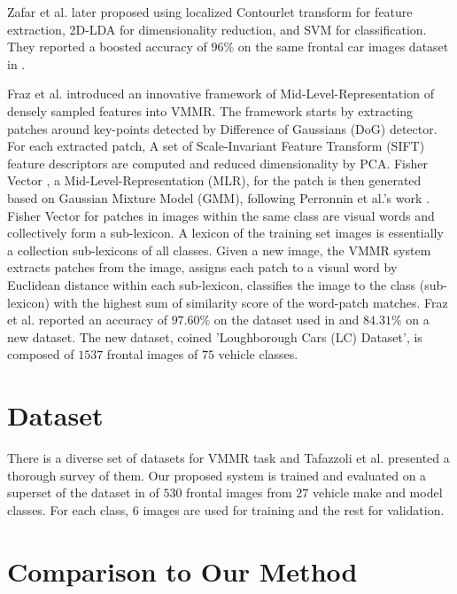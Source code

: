 Zafar et al. \citep{zafar2009localized} later proposed using localized Contourlet transform for feature extraction, 2D-LDA for dimensionality reduction, and SVM for classification.
They reported a boosted accuracy of $96\%$ on the same frontal car images dataset in \citep{zafar2007two}.


Fraz et al. \citep{fraz2014mid} introduced an innovative framework of Mid-Level-Representation of densely sampled features into VMMR.
The framework starts by extracting patches around key-points detected by Difference of Gaussians (DoG) detector.
For each extracted patch, A set of Scale-Invariant Feature Transform (SIFT) \citep{lowe2004distinctive} feature descriptors are computed and reduced dimensionality by PCA.
Fisher Vector \citep{jaakkola1999exploiting}, a Mid-Level-Representation (MLR), for the patch is then generated based on Gaussian Mixture Model (GMM), following Perronnin et al.'s work \citep{perronnin2010improving}.
Fisher Vector for patches in images within the same class are visual words and collectively form a sub-lexicon.
A lexicon of the training set images is essentially a collection sub-lexicons of all classes.
Given a new image, the VMMR system 
extracts patches from the image, 
assigns each patch to a visual word by Euclidean distance within each sub-lexicon, 
classifies the image to the class (sub-lexicon) with the highest sum of similarity score of the word-patch matches.
Fraz et al. reported an accuracy of $97.60\%$ on the dataset used in \citep{zafar2009localized} and $84.31\%$ on a new dataset. The new dataset, coined 'Loughborough Cars (LC) Dataset', is composed of $1537$ frontal images of $75$ vehicle classes.


\section{Dataset}
There is a diverse set of datasets for VMMR task and Tafazzoli et al. \citep{tafazzoli2017large} presented a thorough survey of them.
Our proposed system is trained and evaluated on a superset of the dataset in \citep{zafar2007two,zafar2009localized,fraz2014mid} of $530$ frontal images from $27$ vehicle make and model classes.
For each class, $6$ images are used for training and the rest for validation.

\section{Comparison to Our Method}

